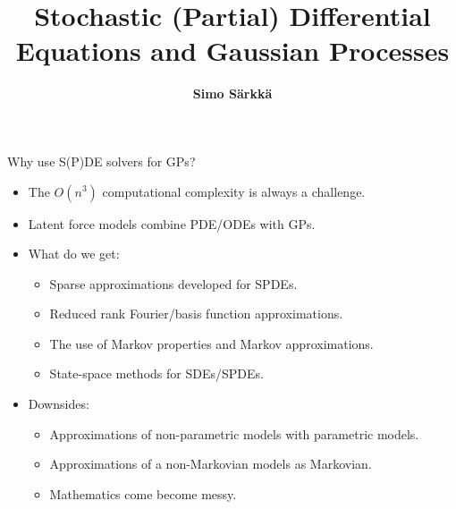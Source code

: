 \documentclass[first=dgreen,second=purple,presentation]{elecslides}
\title{Stochastic (Partial) Differential Equations and Gaussian Processes}
\author{{\bf Simo S\"arkk\"a}}
\institute{Aalto University, Finland}
\date{}
\begin{document}

\aaltotitleframe




\begin{frame}{Why use S(P)DE solvers for GPs?}


\begin{itemize}[<+->]
\item The $O(n^3)$ \alert{computational complexity} is always a challenge.
\item \alert{Latent force models} combine PDE/ODEs with GPs.
\item What do we get:
\begin{itemize}[<+->]
\item Sparse approximations developed for SPDEs.
\item Reduced rank Fourier/basis function approximations.
\item The use of Markov properties and Markov approximations.
\item State-space methods for SDEs/SPDEs.
\end{itemize}
\item Downsides:
\begin{itemize}[<+->]
\item Approximations of non-parametric models with parametric models.
\item Approximations of a non-Markovian models as Markovian.
\item Mathematics come become messy.
\end{itemize}
\end{itemize}
\end{frame}

\end{document}

